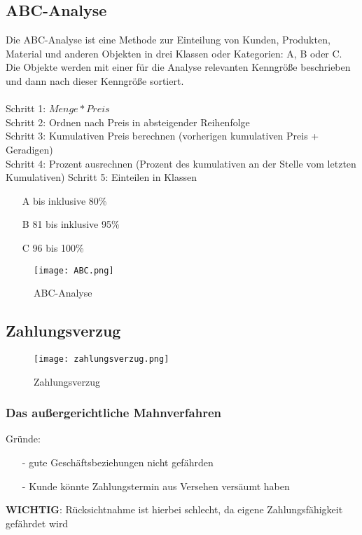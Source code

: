 \documentclass[asp1.tex]{subfiles}
\begin{document}
\break

\subsection{ABC-Analyse}

Die ABC-Analyse ist eine Methode zur Einteilung von Kunden, Produkten, Material und anderen Objekten in drei Klassen oder Kategorien: A, B oder C. \\
Die Objekte werden mit einer für die Analyse relevanten Kenngröße beschrieben und dann nach dieser Kenngröße sortiert. \\ \\
Schritt 1: $Menge * Preis$ \\
Schritt 2: Ordnen nach Preis in absteigender Reihenfolge \\
Schritt 3: Kumulativen Preis berechnen (vorherigen kumulativen Preis + Geradigen) \\
Schritt 4: Prozent ausrechnen (Prozent des kumulativen an der Stelle vom letzten \\ Kumulativen)
Schritt 5: Einteilen in Klassen
\begin{itemize}
    \item[A] bis inklusive 80\%
    \item[B] 81 bis inklusive 95\%
    \item[C] 96 bis 100\%
\end{itemize}
\begin{figure}[H]
    \begin{center}
        \texttt{[image: ABC.png]}
    \end{center}
    \caption{ABC-Analyse}
\end{figure}

\subsection{Zahlungsverzug}
\begin{figure}[H]
    \begin{center}
        \texttt{[image: zahlungsverzug.png]}
    \end{center}
    \caption{Zahlungsverzug}

\end{figure}
\subsubsection {Das außergerichtliche Mahnverfahren}
Gründe:
\begin{itemize}
    \item[-] gute Geschäftsbeziehungen nicht gefährden
    \item[-] Kunde könnte Zahlungstermin aus Versehen versäumt haben
\end{itemize}
\textbf {WICHTIG}: Rücksichtnahme ist hierbei schlecht, da eigene Zahlungsfähigkeit gefährdet wird
\end{document}
